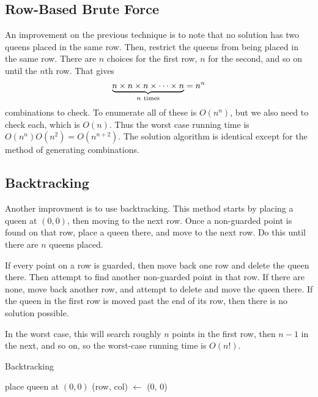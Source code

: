 \documentclass{article}
\begin{document}
\subsection*{Row-Based Brute Force}
\label{sub:row_based_brute_force}

An improvement on the previous technique is to note that no solution has two
queens placed in the same row. Then, restrict the queens from being placed in
the same row. There are $n$ choices for the first row, $n$ for the second, and
so on until the $n$th row. That gives $$\underbrace{n \times n \times n \times
\cdots \times n}_{n \ \rm times} = n^n$$ combinations to check. To enumerate all
of these is $O(n^n)$, but we also need to check each, which is $O(n)$. Thus the
worst case running time is $O(n^n)O(n^2) = O(n^{n+2})$. The solution algorithm is
identical except for the method of generating combinations.

\subsection*{Backtracking}
\label{sub:backtracking}

Another improvment is to use backtracking. This method starts by placing a queen
at $(0, 0)$, then moving to the next row. Once a non-guarded point is found on
that row, place a queen there, and move to the next row. Do this until there are
$n$ queens placed.

If every point on a row is guarded, then move back one row and delete the queen
there. Then attempt to find another non-guarded point in that row. If there are
none, move back another row, and attempt to delete and move the queen there. If
the queen in the first row is moved past the end of its row, then there is no
solution possible.

In the worst case, this will search roughly $n$ points in the first row, then
$n - 1$ in the next, and so on, so the worst-case running time is $O(n!)$.

\begin{algorithm}[H]
    \caption{Backtracking}

    place queen at $(0, 0)$\;
    (row, col) $\leftarrow$ (0, 0)\;

\end{algorithm}
\end{document}
